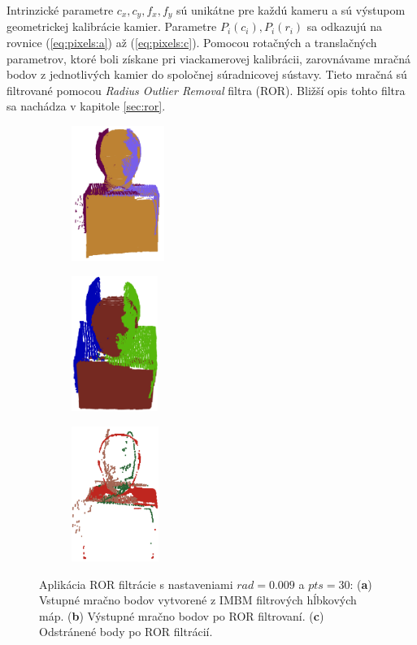 Intrinzické parametre $c_x, c_y, f_x, f_y$ sú unikátne pre každú kameru a sú výstupom geometrickej kalibrácie kamier. Parametre $P_i(c_i),P_i(r_i)$ sa odkazujú na rovnice (\ref{eq:pixels:a}) až (\ref{eq:pixels:c}). Pomocou rotačných a translačných parametrov, ktoré boli získane pri viackamerovej kalibrácii, zarovnávame mračná bodov z jednotlivých kamier do spoločnej súradnicovej sústavy. Tieto mračná sú filtrované pomocou \textit{Radius Outlier Removal} filtra (ROR). Bližší opis tohto filtra sa nachádza v kapitole \ref{sec:ror}. 


\begin{figure}[h]
	\centering
	\begin{subfigure}[b]{0.32\textwidth}
		\centering
		\includegraphics[height=4.4cm]{figures/model_colors.png}
		\caption{}
		\label{fig:ror:a}
	\end{subfigure}
	\hfill
	\begin{subfigure}[b]{0.32\textwidth}
		\centering
		\includegraphics[height=4.4cm]{figures/ror_preserv.png}
		\caption{}
		\label{fig:ror:b}
	\end{subfigure}
	\hfill
	\begin{subfigure}[b]{0.32\textwidth}
		\centering
		\includegraphics[height=4.4cm]{figures/ror_rem.png}
		\caption{}
		\label{fig:ror:c}
	\end{subfigure}
	\caption{Aplikácia ROR filtrácie s nastaveniami $rad=0.009$ a  $pts=30$: (\textbf{a}) Vstupné mračno bodov vytvorené z IMBM filtrových hĺbkových máp. (\textbf{b}) Výstupné mračno bodov po ROR filtrovaní. (\textbf{c}) Odstránené body po ROR filtrácií.}
	\label{fig:ror}
\end{figure}

